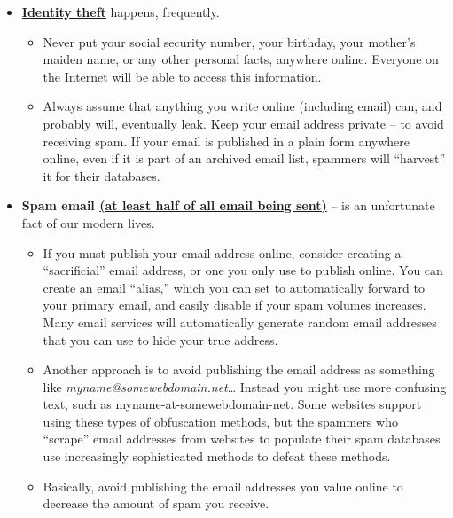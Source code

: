 \documentclass[
]{book}
\providecommand{\tightlist}{%
  \setlength{\itemsep}{0pt}\setlength{\parskip}{0pt}}
\theoremstyle{definition}
\theoremstyle{definition}
\theoremstyle{definition}
\theoremstyle{definition}
\theoremstyle{remark}
\begin{document}
\begin{itemize}
\tightlist
\item
  \href{https://en.wikipedia.org/wiki/Identity_theft}{\textbf{Identity theft}} happens, frequently.

  \begin{itemize}
  \tightlist
  \item
    Never put your social security number, your birthday, your mother's maiden name, or any other personal facts, anywhere online. Everyone on the Internet will be able to access this information.\\
  \item
    Always assume that anything you write online (including email) can, and probably will, eventually leak. Keep your email address private -- to avoid receiving spam. If your email is published in a plain form anywhere online, even if it is part of an archived email list, spammers will ``harvest'' it for their databases.\\
  \end{itemize}
\item
  \textbf{Spam email \href{https://securelist.com/spam-report-2019/96527/}{(at least half of all email being sent)}} -- is an unfortunate fact of our modern lives.

  \begin{itemize}
  \tightlist
  \item
    If you must publish your email address online, consider creating a ``sacrificial'' email address, or one you only use to publish online. You can create an email ``alias,'' which you can set to automatically forward to your primary email, and easily disable if your spam volumes increases. Many email services will automatically generate random email addresses that you can use to hide your true address.
  \item
    Another approach is to avoid publishing the email address as something like \emph{myname@somewebdomain.net}\ldots{} Instead you might use more confusing text, such as myname-at-somewebdomain-net. Some websites support using these types of obfuscation methods, but the spammers who ``scrape'' email addresses from websites to populate their spam databases use increasingly sophisticated methods to defeat these methods.\\
  \item
    Basically, avoid publishing the email addresses you value online to decrease the amount of spam you receive.
  \end{itemize}
\end{itemize}
\end{document}
